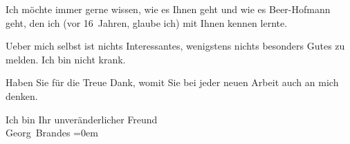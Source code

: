 \pstart
           Ich möchte immer gerne wissen, wie es {\pb}Ihnen geht und wie es Beer-Hofmann geht, den ich (vor 16 Jahren,
               glaube ich) mit Ihnen kennen lernte.\pend
           
\pstart
           Ueber mich selbst ist nichts Interessantes, wenigstens nichts besonders Gutes zu
               melden. Ich bin nicht krank.\pend
           
\pstart
           Haben Sie für die Treue Dank, womit Sie bei jeder neuen Arbeit auch an mich
               denken.\pend
           
\pstart
           Ich bin Ihr unveränderlicher Freund{\\[\baselineskip]}\spacefill\mbox{Georg Brandes}\pend
           \leftskip=0em{}\endnumbering{}  
      